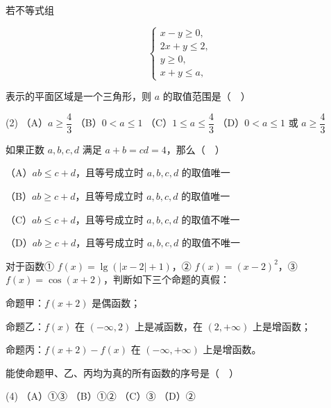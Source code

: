 \begin{question}
若不等式组

\nopagebreak[4]
\[
\begin{cases}
x-y\geq 0,\\
2x+y\leq 2,\\
y\geq 0,\\
x+y\leq a,
\end{cases}
\]

表示的平面区域是一个三角形，则 $a$ 的取值范围是（　）

\begin{gkopts}(2)
\task （A）$a\geq\dfrac43$
\task （B）$0<a\leq 1$
\task （C）$1\leq a\leq\dfrac43$
\task （D）$0<a\leq 1$ 或 $a\geq\dfrac43$
\end{gkopts}

\end{question}
\begin{question}
如果正数 $a,b,c,d$ 满足 $a+b=cd=4$，那么（　）

（A）$ab\leq c+d$，且等号成立时 $a,b,c,d$ 的取值唯一

（B）$ab\geq c+d$，且等号成立时 $a,b,c,d$ 的取值唯一

（C）$ab\leq c+d$，且等号成立时 $a,b,c,d$ 的取值不唯一

（D）$ab\geq c+d$，且等号成立时 $a,b,c,d$ 的取值不唯一

\end{question}
\begin{question}
对于函数① $f(x)=\lg(|x-2|+1)$，② $f(x)=(x-2)^2$，③ $f(x)=\cos(x+2)$，判断如下三个命题的真假：

命题甲：$f(x+2)$ 是偶函数；

命题乙：$f(x)$ 在 $(-\infty,2)$ 上是减函数，在 $(2,+\infty)$ 上是增函数；

命题丙：$f(x+2)-f(x)$ 在 $(-\infty,+\infty)$ 上是增函数。

能使命题甲、乙、丙均为真的所有函数的序号是（　）

\begin{gkopts}(4)
\task （A）①③
\task （B）①②
\task （C）③
\task （D）②
\end{gkopts}

\end{question}

